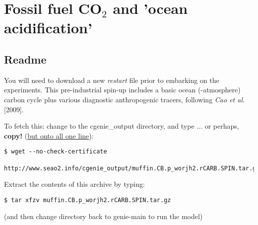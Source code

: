 
\cleardoublepage


\chapter{Fossil fuel CO$_{2}$ and 'ocean acidification'}\label{ch:fossil-fuel-co2}

\hfill \break

\newpage

\section*{Readme}

You will need to download a new \textit{restart} file prior to embarking on the experiments. This pre-industrial spin-up includes a basic ocean (-atmosphere) carbon cycle plus various diagnostic anthropogenic tracers, following \textit{Cao et al.} [2009].

\vspace{2mm}

\noindent To fetch this: change to the \textsf{\footnotesize cgenie\_output} directory, and type ... or perhaps, \textbf{copy!} (\uline{but onto all one line}):
\vspace{-2mm}
\begin{verbatim}
$ wget --no-check-certificate 
   http://www.seao2.info/cgenie_output/muffin.CB.p_worjh2.rCARB.SPIN.tar.gz
\end{verbatim}
\vspace{-2mm}

\noindent Extract the contents of this archive by typing:
\vspace{-2mm}
\begin{verbatim}
$ tar xfzv muffin.CB.p_worjh2.rCARB.SPIN.tar.gz
\end{verbatim}
\vspace{-2mm}
\noindent (and then change directory back to \textsf{\footnotesize genie-main} to run the model)

\newpage

